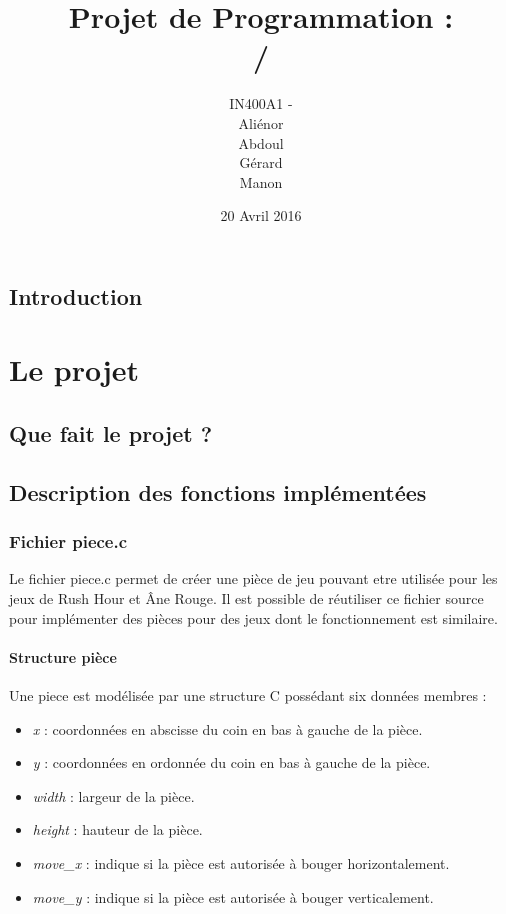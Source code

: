 \documentclass{report}
\title{Projet de Programmation :\\ \bsc{rush hour} / \bsc{âne rouge}}
\author{IN400A1 - \bsc{Groupe 6}\\Aliénor \bsc{brabant}\\Abdoul \bsc{diallo}\\Gérard \bsc{lézé}\\{Manon \bsc{philippot}}}
\date{20 Avril 2016}
\begin{document}
\maketitle
\tableofcontents

\chapter*{Introduction}

\part{Le projet}

\chapter{Que fait le projet ?}

\chapter{Description des fonctions implémentées}
\section{Fichier piece.c}
Le fichier piece.c permet de créer une pièce de jeu pouvant etre utilisée pour les jeux de Rush Hour et Âne Rouge. Il est possible de réutiliser ce fichier source pour implémenter des pièces pour des jeux dont le fonctionnement est similaire.
\subsection{Structure pièce}
Une piece est modélisée par une structure C possédant six données membres :
\begin{itemize}
\item \emph{x} :  coordonnées en abscisse du coin en bas à gauche de la pièce.
\item \emph{y} : coordonnées en ordonnée du coin en bas à gauche de la pièce.
\item \emph{width} : largeur de la pièce.
\item \emph{height} : hauteur de la pièce.
\item \emph{move\_x} : indique si la pièce est autorisée à bouger horizontalement.
\item \emph{move\_y} : indique si la pièce est autorisée à bouger verticalement.
\end{itemize}
\end{document}
